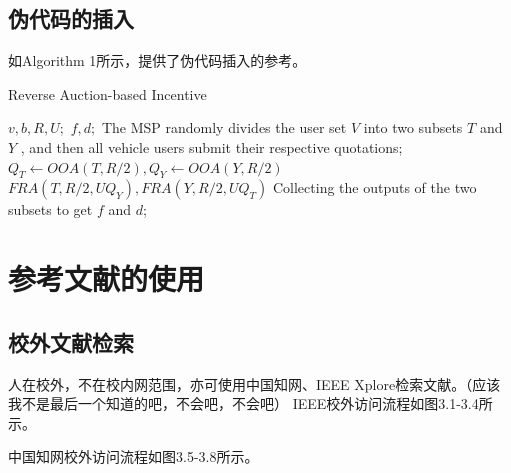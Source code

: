\documentclass[a4paper,AutoFakeBold,oneside,12pt]{book}
\begin{document}
\section{伪代码的插入}
如Algorithm 1所示，提供了伪代码插入的参考。
\begin{algorithm}
	\begin{spacing}{1.3}
		\caption{Reverse Auction-based Incentive} 
		\label{RAI}
		\renewcommand{\algorithmicrequire}{\textbf{Input:}}
		\renewcommand{\algorithmicensure}{\textbf{Output:}} 
			\begin{algorithmic}[1] 
				\Require 
				$v, b, R, U;$
				\Ensure $f, d;$
				\State 
				The MSP randomly divides the user set $V$ into two subsets $T$ and $Y$ , and then all vehicle users submit their respective quotations;
				\State 
				$Q_{T} \leftarrow OOA(T, R/2), Q_{Y} \leftarrow OOA(Y,R/2)$
				\State 
				$FRA\left(T, R/2, U Q_{Y}\right),FRA\left(Y, R/2, U Q_{T}\right)$    
				\State 
				Collecting the outputs of the two subsets to get $f$ and $d$; 
			    \State
			\end{algorithmic}
	\end{spacing}
\end{algorithm}

\chapter{参考文献的使用}
\section{校外文献检索}
人在校外，不在校内网范围，亦可使用中国知网、IEEE Xplore检索文献。（应该我不是最后一个知道的吧，不会吧，不会吧）
IEEE校外访问流程如图3.1-3.4所示。


中国知网校外访问流程如图3.5-3.8所示。
\\
\\
\\
\\
\end{document}
